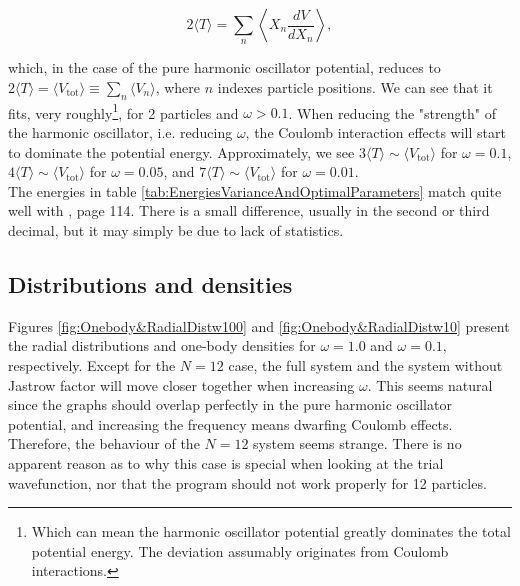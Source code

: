 \documentclass[english, a4paper]{article}
\begin{document}
	\begin{equation}
		2\langle T\rangle = \sum_n\left\langle X_n\frac{dV}{dX_n} \right\rangle,
	\end{equation}
	
	which, in the case of the pure harmonic oscillator potential, reduces to $2\langle T\rangle = \langle V_{\text{tot}}\rangle \equiv \sum_{n} \langle V_n\rangle$, where $n$ indexes particle positions. We can see that it fits, very roughly\footnote{Which can mean the harmonic oscillator potential greatly dominates the total potential energy. The deviation assumably originates from Coulomb interactions.}, for 2 particles and $\omega>0.1$. When reducing the "strength" of the harmonic oscillator, i.e. reducing $\omega$, the Coulomb interaction effects will start to dominate the potential energy. Approximately, we see $3\langle T\rangle \sim \langle V_{\text{tot}}\rangle$ for $\omega = 0.1$, $4\langle T\rangle \sim \langle V_{\text{tot}}\rangle$ for $\omega = 0.05$, and $7\langle T\rangle \sim \langle V_{\text{tot}}\rangle$ for $\omega = 0.01$.\\
	
	The energies in table \ref{tab:EnergiesVarianceAndOptimalParameters} match quite well with \cite{H_Msc}, page 114. There is a small difference, usually in the second or third decimal, but it may simply be due to lack of statistics.
	
	\subsection{Distributions and densities}
	Figures \ref{fig:Onebody&RadialDistw100} and \ref{fig:Onebody&RadialDistw10} present the radial distributions and one-body densities for $\omega = 1.0$ and $\omega = 0.1$, respectively. Except for the $N=12$ case, the full system and the system without Jastrow factor will move closer together when increasing $\omega$. This seems natural since the graphs should overlap perfectly in the pure harmonic oscillator potential, and increasing the frequency means dwarfing Coulomb effects. Therefore, the behaviour of the $N=12$ system seems strange. There is no apparent reason as to why this case is special when looking at the trial wavefunction, nor that the program should not work properly for 12 particles.\\
	
\end{document}
